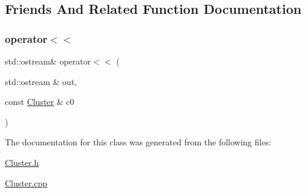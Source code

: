 \subsection{Friends And Related Function Documentation}
\mbox{\label{class_cluster_a80e9d0c8af3d3700176af496cc2dcf29}} 
\subsubsection{\texorpdfstring{operator$<$$<$}{operator<<}}
{\footnotesize\ttfamily std\+::ostream\& operator$<$$<$ (\begin{DoxyParamCaption}\item[{std\+::ostream \&}]{out,  }\item[{const \hyperlink{class_cluster}{Cluster} \&}]{c0 }\end{DoxyParamCaption})\hspace{0.3cm}{\ttfamily [friend]}}



The documentation for this class was generated from the following files\+:\begin{DoxyCompactItemize}
\item 
\hyperlink{_cluster_8h}{Cluster.\+h}\item 
\hyperlink{_cluster_8cpp}{Cluster.\+cpp}\end{DoxyCompactItemize}
